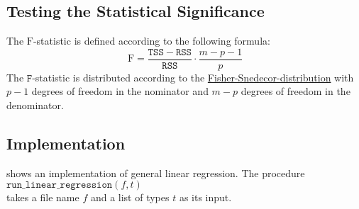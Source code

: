 \subsection{Testing the Statistical Significance}
The $\mathrm{F}$-statistic is defined according to the following formula:
\begin{equation}
  \label{eq:F-statistic}
  \mathrm{F} = \frac{\mathtt{TSS} - \mathtt{RSS}}{\mathtt{RSS}} \cdot \frac{m - p - 1}{p}
\end{equation}
The $\mathtt{F}$-statistic is distributed according to the
\href{https://en.wikipedia.org/wiki/F-distribution}{Fisher-Snedecor-distribution} with $p-1$ degrees of freedom
in the nominator and $m - p$ degrees of freedom in the denominator. 

\subsection{Implementation}
 shows an implementation of general linear regression.
The procedure
\\[0.2cm]
\hspace*{1.3cm}
$\mathtt{run\_linear\_regression}(f, t)$
\\[0.2cm]
takes a file name $f$ and a list of types $t$ as its input.


